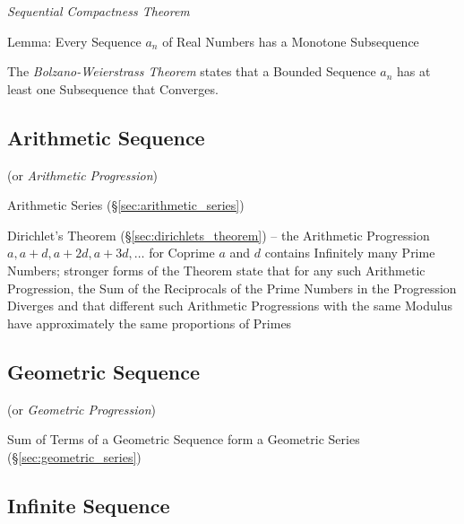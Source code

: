\emph{Sequential Compactness Theorem}

Lemma: Every Sequence $a_n$ of Real Numbers has a Monotone
Subsequence

The \emph{Bolzano-Weierstrass Theorem} states that a Bounded Sequence
$a_n$ has at least one Subsequence that Converges.



\subsection{Arithmetic Sequence}\label{sec:arithmetic_sequence}

(or \emph{Arithmetic Progression})

Arithmetic Series (\S\ref{sec:arithmetic_series})

Dirichlet's Theorem (\S\ref{sec:dirichlets_theorem}) -- the Arithmetic
Progression $a, a + d, a + 2d, a + 3d, \ldots$ for Coprime $a$ and $d$ contains
Infinitely many Prime Numbers; stronger forms of the Theorem state that for any
such Arithmetic Progression, the Sum of the Reciprocals of the Prime Numbers in
the Progression Diverges and that different such Arithmetic Progressions with
the same Modulus have approximately the same proportions of Primes



\subsection{Geometric Sequence}\label{sec:geometric_sequence}

(or \emph{Geometric Progression})

Sum of Terms of a Geometric Sequence form a Geometric Series
(\S\ref{sec:geometric_series})



\subsection{Infinite Sequence}\label{sec:infinite_sequence}

